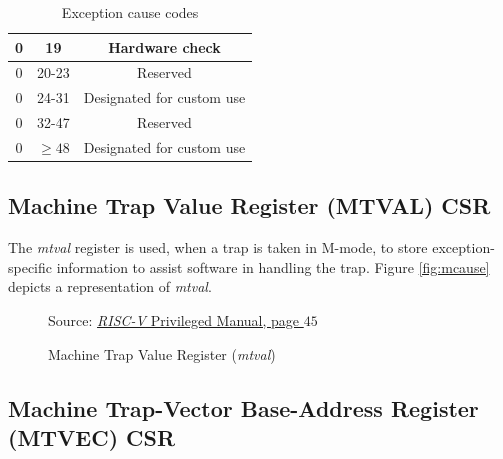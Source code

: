 \begin{table}
\begin{tabular}{|c|c|c|}
    \hline
    0                      & 19            & Hardware check                 \\
    \hline
    0                      & 20-23         & Reserved                       \\
    \hline
    0                      & 24-31         & Designated for custom use      \\
    \hline
    0                      & 32-47         & Reserved                       \\
    \hline
    0                      & $\geq 48$     & Designated for custom use      \\
    \hline
  \end{tabular}
  \caption{Exception cause codes}
  \label{tab:exceptioncauses}
\end{table}

\subsection{Machine Trap Value Register (MTVAL) CSR}
\label{subsec:riscv_mtval}

The \textit{mtval} register is used, when a trap is taken in M-mode, to store exception-specific
information to assist software in handling the trap. Figure \ref{fig:mcause}
depicts a representation of \textit{mtval}. \\
\begin{figure}[H]
  \centering
  \def\stackalignment{r} %
  {\scriptsize Source: \href{https://drive.google.com/file/d/17GeetSnT5wW3xNuAHI95-SI1gPGd5sJ_/view}{\textit{RISC-V} Privileged Manual, page $45$}}
  \caption{Machine Trap Value Register (\textit{mtval})}
  \label{fig:mtval}
\end{figure}

\subsection{Machine Trap-Vector Base-Address Register (MTVEC) CSR}
\label{subsec:riscv_mtvec}

